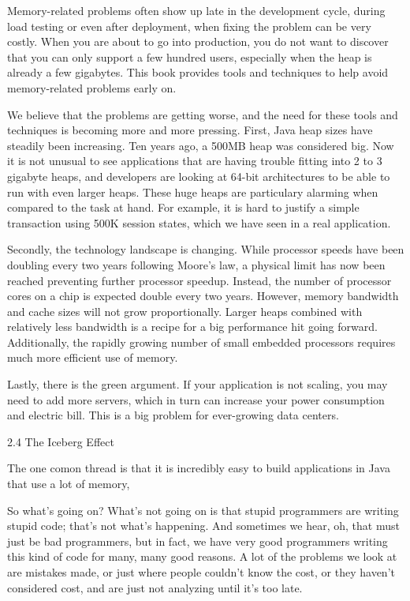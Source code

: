 Memory-related problems often show up late in the development cycle, during load
testing or even after deployment, when fixing the problem can be very costly.
When you are about to go into production, you do not want to discover that you
can only support a few hundred users, especially when the heap is already a few
gigabytes. This book provides tools and techniques to help avoid memory-related
problems early on.

We believe that the problems are getting worse, and the need for these tools and
techniques is becoming more and more pressing. First, Java heap sizes have
steadily been increasing.  Ten years ago, a 500MB heap was considered big. Now
it is not unusual to see applications that are having trouble fitting into 2 to
3 gigabyte heaps, and developers are looking at 64-bit architectures to be able
to run with even larger heaps.  These huge heaps are particulary alarming when
compared to the task at hand. For example, it is hard to justify a simple
transaction using 500K session states, which we have seen in a real application.

Secondly, the technology landscape is changing. While processor speeds have been
doubling every two years following Moore's law, a physical limit has now been
reached preventing further processor speedup. Instead, the number of processor
cores on a chip is expected double every two years. However, memory bandwidth
and cache sizes will not grow proportionally. Larger heaps combined with
relatively less bandwidth is a recipe for a big performance hit going forward.
Additionally, the rapidly growing number of small embedded processors requires
much more efficient use of memory.

Lastly, there is the green argument. If your application is not scaling, you may
need to add more servers, which in turn can increase your power consumption and
electric bill. This is a big problem for ever-growing data centers.


2.4 The Iceberg Effect

The one comon thread is that it is incredibly easy to build applications in Java
that use a lot of memory,

So what's going on? What's not going on is that stupid programmers are writing
stupid code; that's not what's happening.  And sometimes we hear, oh, that must
just be bad programmers, but in fact, we have very good programmers writing this
kind of code for many, many good reasons. A lot of the problems we look at are
mistakes made, or just where people couldn't know the cost, or they haven't
considered cost, and are just not analyzing until it's too late.


